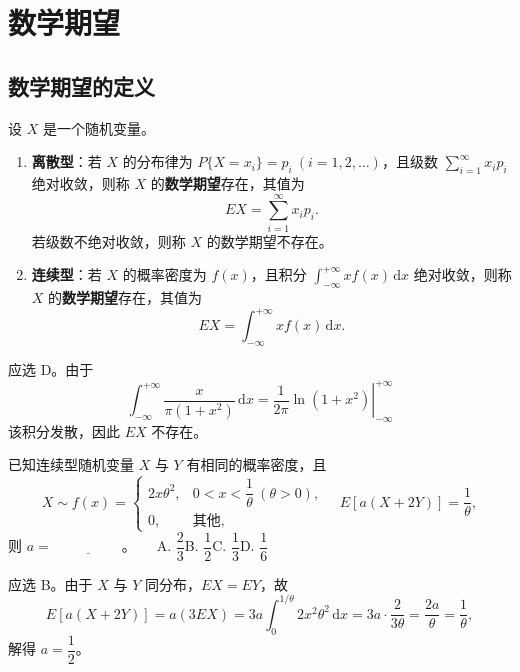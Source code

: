 \documentclass[lang=cn,11pt]{elegantbook}
\begin{document}
\section{数学期望}

\subsection{数学期望的定义}

\begin{definition}[数学期望] \label{def:expectation}
设 \(X\) 是一个随机变量。
\begin{enumerate}
    \item \textbf{离散型}：若 \(X\) 的分布律为 \(P\{X=x_i\} = p_i\ (i=1,2,\dots)\)，且级数 \(\sum\limits_{i=1}^{\infty} x_i p_i\) 绝对收敛，则称 \(X\) 的\textbf{数学期望}存在，其值为
    \[
    EX = \sum_{i=1}^{\infty} x_i p_i.
    \]
    若级数不绝对收敛，则称 \(X\) 的数学期望不存在。
    \item \textbf{连续型}：若 \(X\) 的概率密度为 \(f(x)\)，且积分 \(\int_{-\infty}^{+\infty} x f(x)\,\mathrm{d}x\) 绝对收敛，则称 \(X\) 的\textbf{数学期望}存在，其值为
    \[
    EX = \int_{-\infty}^{+\infty} x f(x)\,\mathrm{d}x.
    \]
\end{enumerate}
\end{definition}

\begin{solution}
应选 D。由于
\[
\int_{-\infty}^{+\infty} \frac{x}{\pi(1+x^2)}\,\mathrm{d}x = \left.\frac{1}{2\pi}\ln(1+x^2)\right|_{-\infty}^{+\infty}
\]
该积分发散，因此 \(EX\) 不存在。
\end{solution}

\begin{exercise}\label{exer:4-s1-linear}
已知连续型随机变量 \(X\) 与 \(Y\) 有相同的概率密度，且
\[
X \sim f(x) = \begin{cases} 2x\theta^2, & 0 < x < \dfrac{1}{\theta}\ (\theta > 0), \\[4pt] 0, & \text{其他}, \end{cases}
\quad E[a(X+2Y)] = \frac{1}{\theta},
\]
则 \(a =\,\underline{\hspace{2cm}}\)。~~~A. \(\dfrac{2}{3}\)\quad B. \(\dfrac{1}{2}\)\quad C. \(\dfrac{1}{3}\)\quad D. \(\dfrac{1}{6}\)
\end{exercise}
\begin{solution}
应选 B。由于 \(X\) 与 \(Y\) 同分布，\(EX = EY\)，故
\[
E[a(X+2Y)] = a(3EX) = 3a\int_0^{1/\theta} 2x^2\theta^2\,\mathrm{d}x = 3a\cdot\frac{2}{3\theta} = \frac{2a}{\theta} = \frac{1}{\theta},
\]
解得 \(a = \dfrac{1}{2}\)。
\end{solution}
\end{document}
